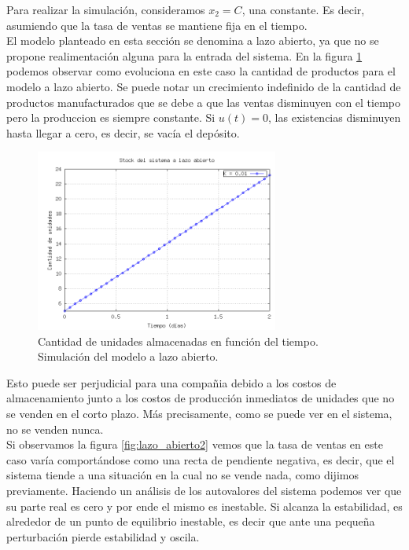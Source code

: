 \documentclass{sig-alternate}
\begin{document}
Para realizar la simulación, consideramos $x_{2} = C$, una constante. Es decir, asumiendo que la tasa de ventas se mantiene fija en el tiempo.\\
El modelo planteado en esta sección se denomina a lazo abierto, ya que no se propone realimentación alguna para la entrada del sistema. 
En la figura \ref{fig:lazo_abierto} podemos observar como evoluciona en este caso la cantidad de productos para el modelo a lazo abierto. 
Se puede notar un crecimiento indefinido de la cantidad de productos manufacturados que se debe a que las ventas disminuyen con el tiempo pero la 
produccion es siempre constante. Si $u(t)=0$, las existencias disminuyen hasta llegar a cero, es decir, se vacía el depósito. 

\begin{figure}[h]
\begin{center}
\includegraphics[width=8cm]{../src/lazo_abierto.png}
\caption{\label{fig:lazo_abierto}Cantidad de unidades almacenadas en función del tiempo. Simulación del modelo a lazo abierto.}
\end{center}
\end{figure}
Esto puede ser perjudicial para una compañia debido a los costos de almacenamiento junto a los costos de producción inmediatos de unidades 
que no se venden en el corto plazo. Más precisamente, como se puede ver en el sistema, no se venden nunca.\\
Si observamos la figura \ref{fig:lazo_abierto2} vemos que la tasa de ventas en este caso varía comportándose como una recta de pendiente negativa, 
es decir, que el sistema tiende a una situación en la cual no se vende nada, como dijimos previamente. Haciendo un análisis de los autovalores 
del sistema podemos ver que su parte real es cero y por ende el mismo es inestable. Si alcanza la estabilidad, es alrededor de un punto de equilibrio 
inestable, es decir que ante una pequeña perturbación pierde estabilidad y oscila. 
\end{document}
